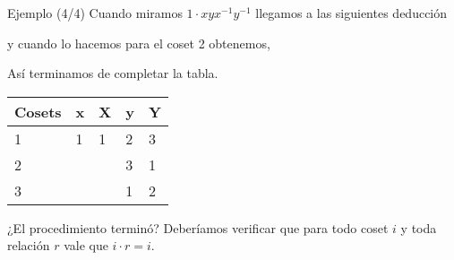\documentclass[aspectratio=169, 9pt]{beamer}
\begin{document}
\begin{frame}[fragile]{Ejemplo (4/4)}
	Cuando miramos $1 \cdot xyx^{-1}y^{-1}$ llegamos a las siguientes deducción
	\pause
	\begin{center}
	\end{center}
	\pause
	y cuando lo hacemos para el coset 2 obtenemos,
	\begin{center}
	\end{center}
	\pause
	Así terminamos de completar la tabla.
	
	\begin{table}[]
		\begin{tabular}{|l|l|l|l|l|}
			\hline
			Cosets     & x          & X          & y          & Y          \\ \hline
			{1} & {1} & {1} & {2} & {3} \\ \hline
			{2} & \color{verde}{2} & \color{verde}{2} & {3} & {1} \\ \hline
			{3} & \color{verde}{3} & \color{verde}{3} & {1} & {2} \\ \hline
		\end{tabular}
	\end{table}
	
	
	
	
	
	¿El procedimiento terminó? 
	\pause
	Deberíamos verificar que para todo coset $i$ y toda relación $r$ vale que $i \cdot r = i$.

\end{frame}
\end{document}
